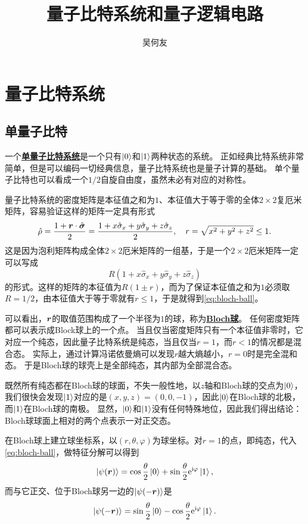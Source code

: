 \documentclass[hyperref, UTF8, a4paper]{ctexart}
\title{量子比特系统和量子逻辑电路}
\author{吴何友}
\newcommand*{\ii}{\mathrm{i}}
\newcommand*{\ee}{\mathrm{e}}
\newcommand*{\concept}[1]{\underline{\textbf{#1}}}
\begin{document}
\maketitle

\section{量子比特系统}

\subsection{单量子比特}

一个\concept{单量子比特系统}是一个只有$\ket{0}$和$\ket{1}$两种状态的系统。
正如经典比特系统非常简单，但是可以编码一切经典信息，量子比特系统也是量子计算的基础。
单个量子比特也可以看成一个$1/2$自旋自由度，虽然未必有对应的对称性。

量子比特系统的密度矩阵是本征值之和为$1$、本征值大于等于零的全体$2 \times 2$复厄米矩阵，容易验证这样的矩阵一定具有形式
\begin{equation}
    \hat{\rho} = \frac{1 + \vb*{r} \cdot \hat{\vb*{\sigma}}}{2} = \frac{1 + x \hat{\sigma}_x + y \hat{\sigma}_y + z \hat{\sigma}_z}{2}, \quad r = \sqrt{x^2+y^2+z^2} \leq 1.
    \label{eq:bloch-ball}
\end{equation}
这是因为泡利矩阵构成全体$2\times 2$厄米矩阵的一组基，于是一个$2\times 2$厄米矩阵一定可以写成
\[
    R(1 + x \hat{\sigma}_x + y \hat{\sigma}_y + z \hat{\sigma}_z)
\]
的形式。这样的矩阵的本征值为$R(1 \pm r)$，而为了保证本征值之和为$1$必须取$R=1/2$，由本征值大于等于零就有$r\leq 1$，于是就得到\eqref{eq:bloch-ball}。

可以看出，$\vb*{r}$的取值范围构成了一个半径为$1$的球，称为\concept{Bloch球}。
任何密度矩阵都可以表示成Block球上的一个点。
当且仅当密度矩阵只有一个本征值非零时，它对应一个纯态，因此量子比特系统是纯态，当且仅当$r=1$，而$r<1$的情况都是混合态。
实际上，通过计算冯诺依曼熵可以发现$r$越大熵越小，$r=0$时是完全混和态。
于是Bloch球的球壳上是全部纯态，其内部为全部混合态。

既然所有纯态都在Bloch球的球面，不失一般性地，以$z$轴和Bloch球的交点为$\ket{0}$，我们很快会发现$\ket{1}$对应的是$(x, y, z) = (0, 0, -1)$，因此$\ket{0}$在Bloch球的北极，而$\ket{1}$在Bloch球的南极。
显然，$\ket{0}$和$\ket{1}$没有任何特殊地位，因此我们得出结论：Bloch球球面上相对的两个点表示一对正交态。

在Bloch球上建立球坐标系，以$(r, \theta, \varphi)$为球坐标。对$r=1$的点，即纯态，代入\eqref{eq:bloch-ball}，做特征分解可以得到
\begin{equation}
    \ket{\psi(\vb*{r})} = \cos \frac{\theta}{2} \ket{0} + \sin \frac{\theta}{2} \ee^{\ii \varphi} \ket{1},
\end{equation}
而与它正交、位于Bloch球另一边的$\ket{\psi(-\vb*{r})}$是
\begin{equation}
    \ket{\psi(-\vb*{r})} = \sin \frac{\theta}{2} \ket{0} - \cos \frac{\theta}{2} \ee^{\ii \varphi} \ket{1}.
\end{equation}
\end{document}
